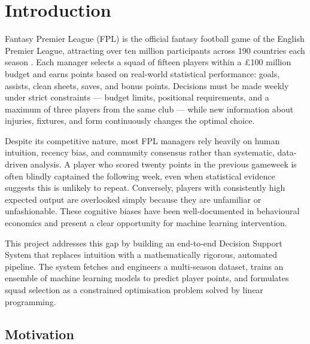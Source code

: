 \documentclass[11pt,english,listoffigures,listoftables]{tfgetsinf}
\begin{document}

\mainmatter


\chapter{Introduction}

Fantasy Premier League (FPL) is the official fantasy football game of the English Premier League, attracting over ten million participants across 190 countries each season \cite{fpl_official}. Each manager selects a squad of fifteen players within a £100 million budget and earns points based on real-world statistical performance: goals, assists, clean sheets, saves, and bonus points. Decisions must be made weekly under strict constraints --- budget limits, positional requirements, and a maximum of three players from the same club --- while new information about injuries, fixtures, and form continuously changes the optimal choice.

Despite its competitive nature, most FPL managers rely heavily on human intuition, recency bias, and community consensus rather than systematic, data-driven analysis. A player who scored twenty points in the previous gameweek is often blindly captained the following week, even when statistical evidence suggests this is unlikely to repeat. Conversely, players with consistently high expected output are overlooked simply because they are unfamiliar or unfashionable. These cognitive biases have been well-documented in behavioural economics and present a clear opportunity for machine learning intervention.

This project addresses this gap by building an end-to-end Decision Support System that replaces intuition with a mathematically rigorous, automated pipeline. The system fetches and engineers a multi-season dataset, trains an ensemble of machine learning models to predict player points, and formulates squad selection as a constrained optimisation problem solved by linear programming.

\section{Motivation}
\end{document}
